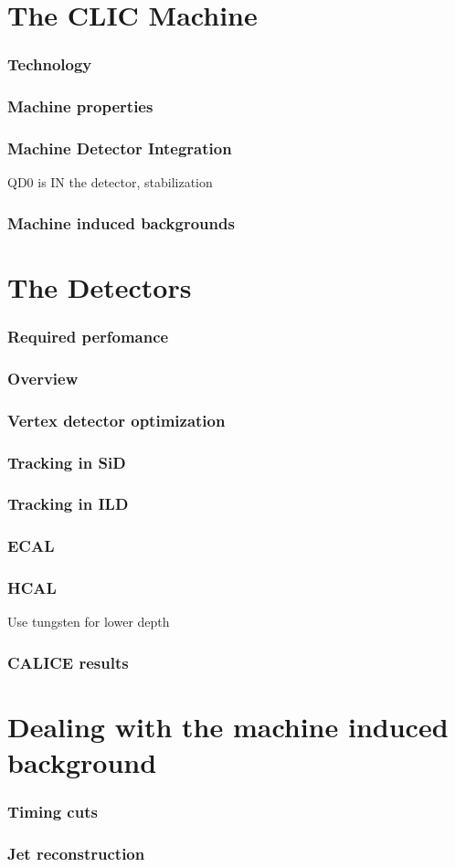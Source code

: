 \documentclass{beamer}
\begin{document}
\section[CLIC]{The CLIC Machine}
\begin{frame}
\frametitle{Technology}

\end{frame}
\begin{frame}
\frametitle{Machine properties}

\end{frame}
\begin{frame}
\frametitle{Machine Detector Integration}
QD0 is IN the detector, stabilization
\end{frame}

\begin{frame}
\frametitle{Machine induced backgrounds}

\end{frame}

\section[Detectors]{The Detectors}
\begin{frame}
\frametitle{Required perfomance}

\end{frame}
\begin{frame}
\frametitle{Overview}
\end{frame}
\begin{frame}
\frametitle{Vertex detector optimization}
\end{frame}

\begin{frame}
\frametitle{Tracking in SiD}

\end{frame}
\begin{frame}
\frametitle{Tracking in ILD}
\end{frame}
\begin{frame}
\frametitle{ECAL}
\end{frame}
\begin{frame}
\frametitle{HCAL}
Use tungsten for lower depth
\end{frame}
\begin{frame}
\frametitle{CALICE results}
\end{frame}

\section[Bkg treatment]{Dealing with the machine induced background}
\begin{frame}
\frametitle{Timing cuts}
\end{frame}
\begin{frame}
\frametitle{Jet reconstruction}
\end{frame}
\end{document}
